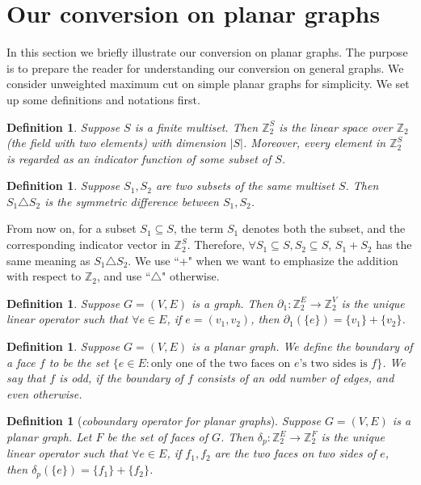 \documentclass[10pt,fleqn]{article}
\newtheorem{definition}[theorem]{Definition}
\newcommand{\Z}{\mathbb{Z}}
\begin{document}
	\section{Our conversion on planar graphs} \label{s0}
	In this section we briefly illustrate our conversion on planar graphs. The purpose is to prepare the reader for understanding our conversion on general graphs. We consider unweighted maximum cut on simple planar graphs for simplicity. We set up some definitions and notations first. 
	\begin{definition} \label{def21}
		Suppose $S$ is a finite multiset. Then $\Z_2^{S}$ is the linear space over $\Z_2$ (the field with two elements) with dimension $|S|$. Moreover, every element in $\Z_2^S$ is regarded as an indicator function of some subset of $S$.
	\end{definition} \par
	\begin{definition}
		Suppose $S_1,S_2$ are two subsets of the same multiset $S$. Then $S_1\triangle S_2$ is the symmetric difference between $S_1,S_2$.
	\end{definition}\par
	From now on, for a subset $S_1\subseteq S$, the term $S_1$ denotes both the subset, and the corresponding indicator vector in $\Z_2^S$. Therefore, $\forall S_1\subseteq S,S_2\subseteq S$, $S_1+S_2$ has the same meaning as $S_1\triangle S_2$. We use ``+" when we want to emphasize the addition with respect to $\Z_2$, and use ``$\triangle$" otherwise.\par
	\begin{definition}
		Suppose $G=(V,E)$ is a graph. Then $\partial_1:\Z_2^{E}\to \Z_2^V$ is the unique linear operator such that $\forall e\in E$, if $e=(v_1,v_2)$, then $\partial_1(\{e\})=\{v_1\}+\{v_2\}$. \par
	\end{definition}
	\begin{definition}
		Suppose $G=(V,E)$ is a planar graph. We define the boundary of a face $f$ to be the set $\{e\in E:\text{only one of the two faces on $e$'s two sides is }f\}$. We say that $f$ is odd, if the boundary of $f$ consists of an odd number of edges, and even otherwise.
	\end{definition}
	\begin{definition}[\it{coboundary operator for planar graphs}]
		Suppose $G=(V,E)$ is a planar graph. Let $F$ be the set of faces of $G$. Then $\delta_p:\Z_2^{E}\to \Z_2^{F}$ is the unique linear operator such that $\forall e\in E$, if $f_1,f_2$ are the two faces on two sides of $e$, then $\delta_p(\{e\})=\{f_1\}+\{f_2\}$.\par
	\end{definition} \par
\end{document}
